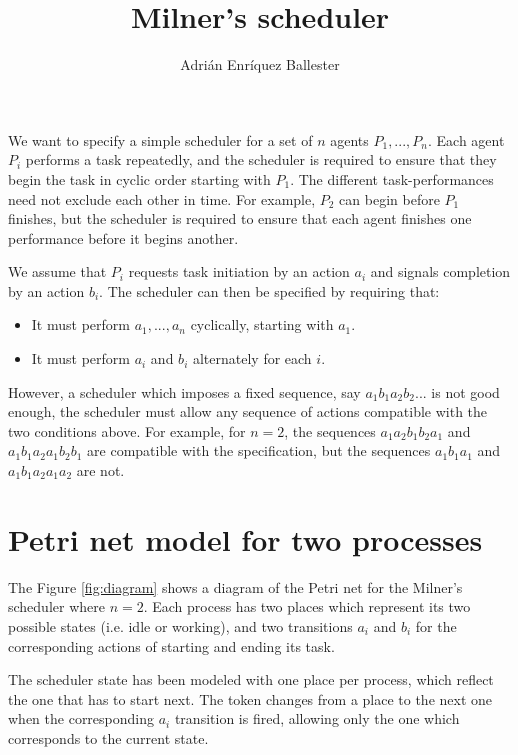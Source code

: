 \documentclass{article}
\title{Milner's scheduler}
\author{Adrián Enríquez Ballester}
\begin{document}
\maketitle

We want to specify a simple scheduler for a set of $n$ agents 
$P_1,..., P_n$. Each agent $P_i$ performs a task repeatedly, 
and the scheduler is required to ensure that they begin the 
task in cyclic order starting with $P_1$. The different 
task-performances need not exclude each other in time. 
For example, $P_2$ can begin before $P_1$ finishes, but the 
scheduler is required to ensure that each agent finishes 
one performance before it begins another.

We assume that $P_i$ requests task initiation by an action 
$a_i$ and signals completion by an action $b_i$. The 
scheduler can then be specified by requiring that:

\begin{itemize}
  \item It must perform $a_1,...,a_n$ cyclically, starting 
    with $a_1$.
  \item It must perform $a_i$ and $b_i$ alternately for each $i$.
\end{itemize}

However, a scheduler which imposes a fixed sequence, say 
$a_1b_1a_2b_2...$ is not good enough, 
the scheduler must allow any sequence of actions compatible with 
the two conditions above. For example, for $n=2$, the sequences 
$a_1a_2b_1b_2a_1$ and $a_1b_1a_2a_1b_2b_1$ are compatible with 
the specification, but the sequences $a_1b_1a_1$ and 
$a_1b_1a_2a_1a_2$ are not.

\section{Petri net model for two processes}

The Figure \ref{fig:diagram} shows a diagram of the Petri net 
for the Milner's scheduler where $n=2$. Each process has two 
places which represent its two possible states (i.e. idle or 
working), and two transitions $a_i$ and $b_i$ for the 
corresponding actions of starting and ending its task.

The scheduler state has been modeled with one place per process,
which reflect the one that has to start next. The token 
changes from a place to the next one when the corresponding 
$a_i$ transition is fired, allowing only the one which corresponds
to the current state.
\end{document}
